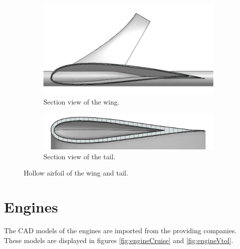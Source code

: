 \documentclass[english,fira]{ist-report}
\begin{document}
\begin{figure}[ht]
    \begin{subfigure}[b]{0.5\linewidth}
    	\centering
    	\includegraphics[width = 1\linewidth]{graphics/cad/wingCut.png}
    	\caption{Section view of the wing.}
    	\label{fig:wingCut}
    \end{subfigure}
    \begin{subfigure}[b]{0.5\linewidth}
    	\centering
    	\includegraphics[width = 1\linewidth]{graphics/cad/tailCut.png}
    	\caption{Section view of the tail.}
    	\label{fig:tailCut}
    \end{subfigure}
    \caption{Hollow airfoil of the wing and tail.}
\end{figure}

\section{Engines}

The CAD models of the engines are imported from the providing companies. These models are displayed in figures \ref{fig:engineCruise} and \ref{fig:engineVtol}.
\end{document}
